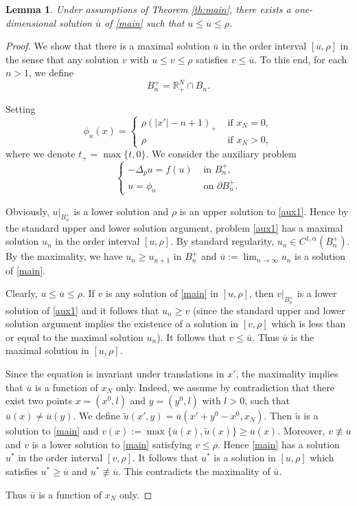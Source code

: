 \documentclass[reqno]{amsart}
\theoremstyle{plain}
\newtheorem{lemma}[theorem]{Lemma}
\theoremstyle{definition}
\theoremstyle{remark}
\begin{document}
	\begin{lemma}\label{lem:upper}
		Under assumptions of Theorem \ref{th:main}, there exists a one-dimensional solution $\overline u$ of \eqref{main} such that $u \le \overline u \le \rho$.
	\end{lemma}
	
	\begin{proof}
		We show that there is a maximal solution $\overline u$ in the order interval $[u, \rho]$ in the sense that any
		solution $v$ with $u\le v\le \rho$ satisfies $v \le \overline u$. To this end, for each $n>1$, we define
		\[
		B_n^+ = \mathbb{R}^N_+ \cap B_n.
		\]
		
		Setting
		\[
		\phi_n(x) =
		\begin{cases}
			\rho(|x'|-n+1)_+ &\text{ if } x_N=0,\\
			\rho &\text{ if } x_N>0,
		\end{cases}
		\]
		where we denote $t_+=\max\{t,0\}$.
		We consider the auxiliary problem
		\begin{equation}\label{aux1}
			\begin{cases}
				-\Delta_p u = f(u) &\text{ in } B_n^+,\\
				u = \phi_n &\text{ on } \partial B_n^+.
			\end{cases}
		\end{equation}
		
		Obviously, $u|_{B_n^+}$ is a lower solution and $\rho$ is an upper solution to \eqref{aux1}. Hence by the standard upper and lower solution argument, problem \eqref{aux1} has a maximal solution $u_n$ in the order interval $[u,\rho]$. By standard regularity, $u_n\in C^{1,\alpha}(B_n^+)$.
		By the maximality, we have $u_n \ge u_{n+1}$ in $B_n^+$ and $\overline u := \lim_{n\to\infty} u_n$ is a solution of \eqref{main}.
		
		Clearly, $u \le \overline u \le \rho$.
		If $v$ is any solution of \eqref{main} in $[u, \rho]$, then $v|_{B_n^+}$ is a lower solution of \eqref{aux1} and it follows that $u_n \ge v$ (since the standard upper and lower solution argument implies the existence of a solution in $[v,\rho]$ which is less than or equal to the maximal solution $u_n$). It follows that $v \le \overline u$. Thus $\overline u$ is the maximal
		solution in $[u, \rho]$.
		
		Since the equation is invariant under translations in $x'$, the maximality implies that $\overline u$ is a function of $x_N$ only.
		Indeed, we assume by contradiction that there exist two points $x=(x^0,l)$ and $y=(y^0,l)$ with $l>0$, such that $\overline u(x)\ne \overline u(y)$. We define $\tilde{u}(x',y)=\overline u(x'+y^0-x^0, x_N)$. Then $\tilde{u}$ is a solution to \eqref{main} and $v(x):=\max\{\overline u(x),\tilde{u}(x)\} \ge \overline u(x)$. Moreover, $v\not\equiv \overline u$ and $v$ is a lower solution to \eqref{main} satisfying $v\le \rho$. Hence \eqref{main} has a solution $u^*$ in the order interval $[v,\rho]$. It follows that $u^*$ is a solution in $[u,\rho]$ which satisfies $u^*\ge \overline u$ and $u^*\not\equiv \overline u$. This contradicts the maximality of $\overline u$.
		
		Thus $\overline u$ is a function of $x_N$ only.
	\end{proof}
	
\end{document}
